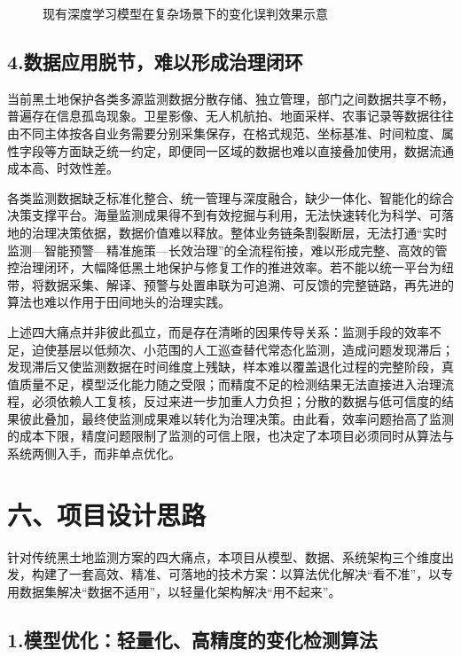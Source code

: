 \documentclass[12pt, a4paper]{ctexart}
\begin{document}
\begin{figure}[htbp]
    \centering
    \caption{现有深度学习模型在复杂场景下的变化误判效果示意}
    \label{fig:img5}
\end{figure}

\subsection{4.数据应用脱节，难以形成治理闭环}

当前黑土地保护各类多源监测数据分散存储、独立管理，部门之间数据共享不畅，普遍存在信息孤岛现象。卫星影像、无人机航拍、地面采样、农事记录等数据往往由不同主体按各自业务需要分别采集保存，在格式规范、坐标基准、时间粒度、属性字段等方面缺乏统一约定，即便同一区域的数据也难以直接叠加使用，数据流通成本高、时效性差。

各类监测数据缺乏标准化整合、统一管理与深度融合，缺少一体化、智能化的综合决策支撑平台。海量监测成果得不到有效挖掘与利用，无法快速转化为科学、可落地的治理决策依据，数据价值难以释放。整体业务链条割裂断层，无法打通“实时监测—智能预警—精准施策—长效治理”的全流程衔接，难以形成完整、高效的管控治理闭环，大幅降低黑土地保护与修复工作的推进效率。若不能以统一平台为纽带，将数据采集、解译、预警与处置串联为可追溯、可反馈的完整链路，再先进的算法也难以作用于田间地头的治理实践。

上述四大痛点并非彼此孤立，而是存在清晰的因果传导关系：监测手段的效率不足，迫使基层以低频次、小范围的人工巡查替代常态化监测，造成问题发现滞后；发现滞后又使监测数据在时间维度上残缺，样本难以覆盖退化过程的完整阶段，真值质量不足，模型泛化能力随之受限；而精度不足的检测结果无法直接进入治理流程，必须依赖人工复核，反过来进一步加重人力负担；分散的数据与低可信度的结果彼此叠加，最终使监测成果难以转化为治理决策。由此看，效率问题抬高了监测的成本下限，精度问题限制了监测的可信上限，也决定了本项目必须同时从算法与系统两侧入手，而非单点优化。

\section{六、项目设计思路}

针对传统黑土地监测方案的四大痛点，本项目从模型、数据、系统架构三个维度出发，构建了一套高效、精准、可落地的技术方案：以算法优化解决“看不准”，以专用数据集解决“数据不适用”，以轻量化架构解决“用不起来”。

\subsection{1.模型优化：轻量化、高精度的变化检测算法}
\end{document}
